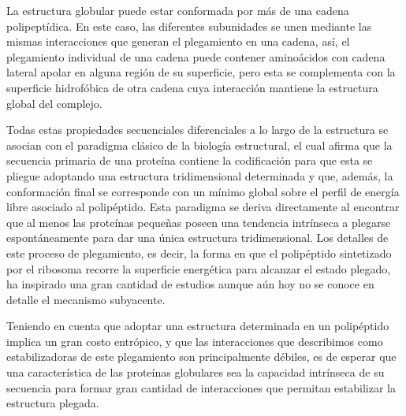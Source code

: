 La estructura globular puede estar conformada por más de una cadena polipeptídica. En este caso, las diferentes subunidades se unen mediante las mismas interacciones que generan el plegamiento en una cadena, así, 
el plegamiento individual de una cadena puede contener aminoácidos con cadena lateral apolar en alguna región de su superficie, pero esta se complementa con la superficie hidrofóbica de otra cadena cuya interacción mantiene la estructura 
global del complejo.



Todas estas propiedades secuenciales diferenciales a lo largo de la estructura se asocian con el paradigma clásico de la biología estructural, el cual afirma que la secuencia primaria de una proteína 
contiene la codificación para que esta se pliegue adoptando una estructura tridimensional determinada y que, además, la conformación final se corresponde con un mínimo global sobre el perfil de energía libre asociado al polipéptido.  
Esta paradigma se deriva directamente al encontrar que al menos las proteínas pequeñas poseen una tendencia intrínseca a plegarse espontáneamente para dar una única estructura tridimensional.
Los detalles de este proceso de plegamiento, es decir, la forma en que el polipéptido sintetizado por el ribosoma recorre la superficie energética para alcanzar el estado plegado, ha inspirado una gran cantidad de estudios 
aunque aún hoy no se conoce en detalle el mecanismo subyacente.

Teniendo en cuenta que adoptar una estructura determinada en un polipéptido implica un gran costo entrópico, y que las interacciones que describimos como estabilizadoras de este plegamiento son principalmente débiles, 
es de esperar que una característica de las proteínas globulares sea la capacidad intrínseca de su secuencia para formar gran cantidad de interacciones que permitan estabilizar la estructura plegada.





